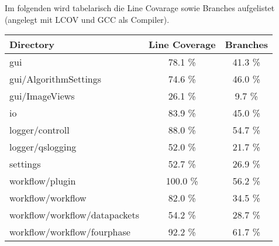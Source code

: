 Im folgenden wird tabelarisch die Line Covarage sowie Branches aufgelistet (angelegt mit LCOV und GCC als Compiler).
\begin{center}
\begin{tabular}{|l|c|c|}
  \hline
  Directory & Line Coverage & Branches \\
  \hline
  \hline
  gui & 78.1 \%  & 41.3 \%  \\
  \hline
  gui/AlgorithmSettings & 74.6 \% & 46.0 \% \\
  \hline
  gui/ImageViews & 26.1 \% & 9.7 \% \\
  \hline
  io & 83.9 \% & 45.0 \% \\
  \hline
  logger/controll & 88.0 \% & 54.7 \% \\
  \hline
  logger/qslogging & 52.0 \% &  	21.7 \% \\
  \hline
  settings & 52.7 \% & 26.9 \% \\
  \hline
  workflow/plugin & 100.0 \% &  56.2 \% \\
  \hline
  workflow/workflow & 82.0 \% &  34.5 \% \\
  \hline
  workflow/workflow/datapackets & 54.2 \% & 28.7 \% \\
  \hline
  workflow/workflow/fourphase & 92.2 \% & 61.7 \% \\
  \hline
 \end{tabular}
 \end{center}